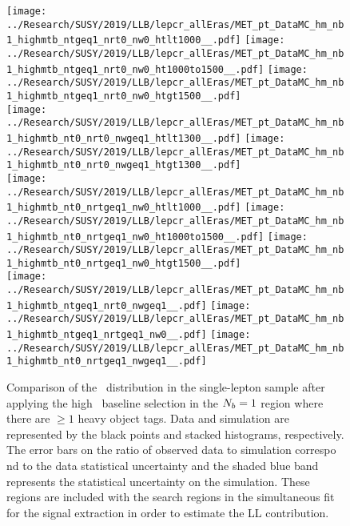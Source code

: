 \begin{figure}[!htb]
	\begin{center}
  \texttt{[image: ../Research/SUSY/2019/LLB/lepcr\_allEras/MET\_pt\_DataMC\_hm\_nb1\_highmtb\_ntgeq1\_nrt0\_nw0\_htlt1000\_\_.pdf]}
  \texttt{[image: ../Research/SUSY/2019/LLB/lepcr\_allEras/MET\_pt\_DataMC\_hm\_nb1\_highmtb\_ntgeq1\_nrt0\_nw0\_ht1000to1500\_\_.pdf]}
  \texttt{[image: ../Research/SUSY/2019/LLB/lepcr\_allEras/MET\_pt\_DataMC\_hm\_nb1\_highmtb\_ntgeq1\_nrt0\_nw0\_htgt1500\_\_.pdf]} \\
  \texttt{[image: ../Research/SUSY/2019/LLB/lepcr\_allEras/MET\_pt\_DataMC\_hm\_nb1\_highmtb\_nt0\_nrt0\_nwgeq1\_htlt1300\_\_.pdf]} 
  \texttt{[image: ../Research/SUSY/2019/LLB/lepcr\_allEras/MET\_pt\_DataMC\_hm\_nb1\_highmtb\_nt0\_nrt0\_nwgeq1\_htgt1300\_\_.pdf]} \\
  \texttt{[image: ../Research/SUSY/2019/LLB/lepcr\_allEras/MET\_pt\_DataMC\_hm\_nb1\_highmtb\_nt0\_nrtgeq1\_nw0\_htlt1000\_\_.pdf]} 
  \texttt{[image: ../Research/SUSY/2019/LLB/lepcr\_allEras/MET\_pt\_DataMC\_hm\_nb1\_highmtb\_nt0\_nrtgeq1\_nw0\_ht1000to1500\_\_.pdf]} 
  \texttt{[image: ../Research/SUSY/2019/LLB/lepcr\_allEras/MET\_pt\_DataMC\_hm\_nb1\_highmtb\_nt0\_nrtgeq1\_nw0\_htgt1500\_\_.pdf]} \\
  \texttt{[image: ../Research/SUSY/2019/LLB/lepcr\_allEras/MET\_pt\_DataMC\_hm\_nb1\_highmtb\_ntgeq1\_nrt0\_nwgeq1\_\_.pdf]} 
  \texttt{[image: ../Research/SUSY/2019/LLB/lepcr\_allEras/MET\_pt\_DataMC\_hm\_nb1\_highmtb\_ntgeq1\_nrtgeq1\_nw0\_\_.pdf]} 
  \texttt{[image: ../Research/SUSY/2019/LLB/lepcr\_allEras/MET\_pt\_DataMC\_hm\_nb1\_highmtb\_nt0\_nrtgeq1\_nwgeq1\_\_.pdf]} \\
	\end{center}
	\caption[Lost Lepton HM Control Region $\nb=1$]{Comparison of the \met~distribution in the single-lepton sample after applying the high \dm~baseline selection in the $\nb=1$ region where there are $\geq1$ heavy object tags. Data and simulation are represented by the black points and stacked histograms, respectively. The error bars on the ratio of observed data to simulation correspo    nd to the data statistical uncertainty and the shaded blue band represents the statistical uncertainty on the simulation. These regions are included with the search regions in the simultaneous fit for the signal extraction in order to estimate the LL contribution.
	 }
	\label{fig:llb-1lcr-datavsmc-hm-nb1}
\end{figure}


